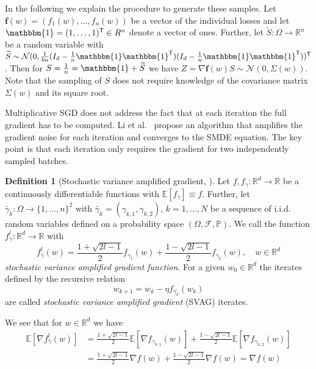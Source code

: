 \documentclass[12pt]{article}
\theoremstyle{definition}
\newtheorem{definition}[definition]{Definition}
\numberwithin{equation}{section}
\newcommand{\R}{\mathbb{R}}
\newcommand{\BP}{\mathbb{P}}
\newcommand{\CF}{\mathcal{F}}
\newcommand{\CN}{\mathcal{N}}
\newcommand{\T}{\mathsf{T}}
\newcommand{\ev}[1]{\mathbb{E}\left[{#1}\right]}
\begin{document}
In the following we explain the procedure to generate these samples.
Let $\pmb{f}(w) = (f_1(w), \dots, f_n(w))$ be a vector of the individual losses and let $\mathbbm{1} = (1, \dots, 1)^\T \in R^n$ denote a vector of ones. Further, let $\widetilde{S} : \Omega \rightarrow \R^n$ be a random variable  with $\widetilde{S} \sim \CN(0, \frac{1}{bn}(I_d - \frac{1}{n}\mathbbm{1}\mathbbm{1}^\T )(I_d - \frac{1}{n}\mathbbm{1}\mathbbm{1}^\T))^\T$. Then for $S = \frac{1}{n} = \mathbbm{1} + \widetilde{S}$ we have $Z = \nabla \pmb{f}(w)S \sim \CN(0, \Sigma(w))$.
Note that the sampling of $S$ does not require knowledge of the covariance matrix $\Sigma(w)$ and its square root.

Multiplicative SGD does not address the fact that at each iteration the full gradient has to be computed. Li et al.\ \cite{liValidityModelingSGD2021} propose an algorithm that amplifies the gradient noise for each iteration and converges to the SMDE equation. The key point is that each iteration only requires the gradient for two independently sampled batches. 
\begin{definition}[Stochastic variance amplified gradient, \cite{liValidityModelingSGD2021}]
  Let $f, f_{\gamma} : \R^d \rightarrow \R$ be a continuously differentiable functions with $\ev{f_{\gamma}} \equiv f$. Further, let $\bar{\gamma}_k : \Omega \rightarrow \{1,\dots,n\}^2 $ with $\bar{\gamma}_k =(\gamma_{k,1}, \gamma_{k,2})$, $k=1,\dots,N$ be a sequence of i.i.d. random variables defined on a probability space $(\Omega, \CF, \BP)$. We call the function $f^l_{\bar{\gamma}} : \R^d \rightarrow \R$ with
  \begin{equation*}
    f^l_{\bar{\gamma}}(w) =  \frac{1+\sqrt{2l - 1}}{2}f_{\gamma_{1}}(w) + \frac{1-\sqrt{2l - 1}}{2}f_{\gamma_{2}}(w), \quad w \in \R^d
  \end{equation*}
  \emph{stochastic variance amplified gradient function}.
    For a given $w_{0} \in \R^d$ the iterates defined by the recursive relation
  \begin{equation*}
    w_{k+1} = w_{k} - \eta f_{\bar{\gamma_k}}(w_{k})
  \end{equation*}
  are called \emph{stochastic variance amplified gradient} (SVAG) iterates.
\end{definition}
We see that for $w \in \R^d$ we have
\begin{align*}
  \ev{\nabla f^l_{\bar{\gamma}}(w)} &= \frac{1+\sqrt{2l - 1}}{2}\ev{\nabla f_{\gamma_{k,1}}(w)} + \frac{1-\sqrt{2l - 1}}{2}\ev{\nabla f_{\gamma_{k,2}}(w)} \\
  &= \frac{1+\sqrt{2l - 1}}{2}\nabla f(w) + \frac{1-\sqrt{2l - 1}}{2} \nabla f(w) = \nabla f(w)
\end{align*}
\end{document}
